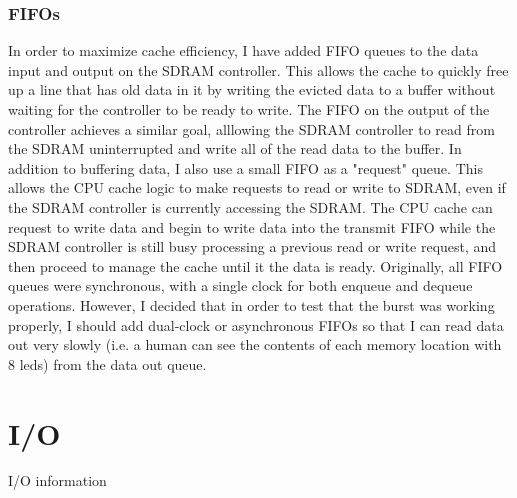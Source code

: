 \documentclass{article}
\begin{document}
\subsubsection{FIFOs}
In order to maximize cache efficiency, I have added FIFO queues to the data input and output on the SDRAM controller. This allows the cache to quickly free up a line that has old data in it by writing the evicted data to a buffer without waiting for the controller to be ready to write. The FIFO on the output of the controller achieves a similar goal, alllowing the SDRAM controller to read from the SDRAM uninterrupted and write all of the read data to the buffer. In addition to buffering data, I also use a small FIFO as a "request" queue. This allows the CPU cache logic to make requests to read or write to SDRAM, even if the SDRAM controller is currently accessing the SDRAM. The CPU cache can request to write data and begin to write data into the transmit FIFO while the SDRAM controller is still busy processing a previous read or write request, and then proceed to manage the cache until it the data is ready. Originally, all FIFO queues were synchronous, with a single clock for both enqueue and dequeue operations. However, I decided that in order to test that the burst was working properly, I should add dual-clock or asynchronous FIFOs so that I can read data out very slowly (i.e. a human can see the contents of each memory location with 8 leds) from the data out queue.

\newpage

\section{I/O}
I/O information
\end{document}
